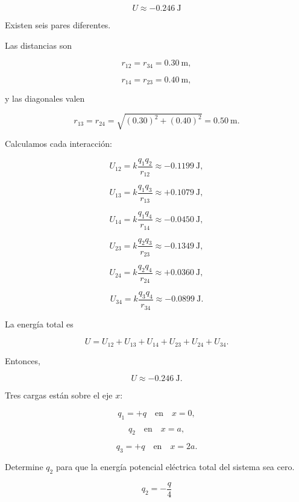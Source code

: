 \begin{respuesta}

\[
\boxed{U\approx-\SI{0.246}{\joule}}
\]

\end{respuesta}

\begin{explicacion}

Existen seis pares diferentes.

Las distancias son

\[
r_{12}=r_{34}=\SI{0.30}{\metre},
\]

\[
r_{14}=r_{23}=\SI{0.40}{\metre},
\]

y las diagonales valen

\[
r_{13}=r_{24}
=
\sqrt{(0.30)^2+(0.40)^2}
=
\SI{0.50}{\metre}.
\]

Calculamos cada interacción:

\[
U_{12}
=
k\frac{q_1q_2}{r_{12}}
\approx-\SI{0.1199}{\joule},
\]

\[
U_{13}
=
k\frac{q_1q_3}{r_{13}}
\approx+\SI{0.1079}{\joule},
\]

\[
U_{14}
=
k\frac{q_1q_4}{r_{14}}
\approx-\SI{0.0450}{\joule},
\]

\[
U_{23}
=
k\frac{q_2q_3}{r_{23}}
\approx-\SI{0.1349}{\joule},
\]

\[
U_{24}
=
k\frac{q_2q_4}{r_{24}}
\approx+\SI{0.0360}{\joule},
\]

\[
U_{34}
=
k\frac{q_3q_4}{r_{34}}
\approx-\SI{0.0899}{\joule}.
\]

La energía total es

\[
U
=
U_{12}+U_{13}+U_{14}+U_{23}+U_{24}+U_{34}.
\]

Entonces,

\[
\boxed{U\approx-\SI{0.246}{\joule}}.
\]

\end{explicacion}


\begin{ejercicio}

Tres cargas están sobre el eje \(x\):

\[
q_1=+q
\quad\text{en}\quad x=0,
\]

\[
q_2
\quad\text{en}\quad x=a,
\]

\[
q_3=+q
\quad\text{en}\quad x=2a.
\]

Determine \(q_2\) para que la energía potencial eléctrica total del sistema sea cero.

\end{ejercicio}

\begin{respuesta}

\[
\boxed{q_2=-\frac{q}{4}}
\]

\end{respuesta}


